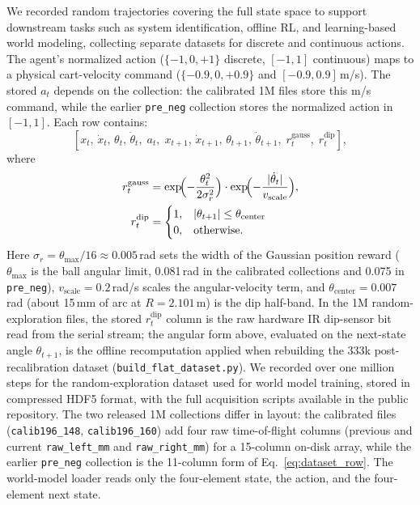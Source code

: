 We recorded random trajectories covering the full state space to
support downstream tasks such as system identification, offline RL,
and learning-based world modeling, collecting separate datasets for
discrete and continuous actions. The agent's normalized action
($\{-1, 0, +1\}$ discrete, $[-1,1]$ continuous) maps to a physical
cart-velocity command ($\{-0.9, 0, +0.9\}$ and $[-0.9, 0.9]$\,m/s). The
stored $a_t$ depends on the collection: the calibrated 1M files store this
m/s command, while the earlier \texttt{pre\_neg} collection stores the
normalized action in $[-1,1]$.
Each row contains:
\begin{equation}
\label{eq:dataset_row}
[x_t,\, \dot{x}_t,\, \theta_t,\, \dot{\theta}_t,\; a_t,\;
 x_{t+1},\, \dot{x}_{t+1},\, \theta_{t+1},\, \dot{\theta}_{t+1},\;
 r^\text{gauss}_t,\; r^\text{dip}_t],
\end{equation}
where
\begin{align}
r^\text{gauss}_t &=
  \exp\!\Bigl(-\frac{\theta_t^2}{2\sigma_r^2}\Bigr)
  \cdot
  \exp\!\Bigl(-\frac{|\dot{\theta}_t|}{v_\text{scale}}\Bigr),
\\
r^\text{dip}_t &=
\begin{cases}
1, & |\theta_{t+1}| \le \theta_\text{center} \\
0, & \text{otherwise.}
\end{cases}
\end{align}
Here $\sigma_r = \theta_\text{max}/16 \approx 0.005$\,rad sets the width
of the Gaussian position reward ($\theta_\text{max}$ is the ball angular
limit, 0.081\,rad in the calibrated collections and 0.075 in
\texttt{pre\_neg}), $v_\text{scale} = 0.2$\,rad/s scales the
angular-velocity term, and $\theta_\text{center} = 0.007$\,rad
(about 15\,mm of arc at $R = 2.101$\,m) is the dip half-band. In the 1M
random-exploration files, the stored $r^\text{dip}_t$ column is the raw
hardware IR dip-sensor bit read from the serial stream; the angular form
above, evaluated on the next-state angle $\theta_{t+1}$, is the offline
recomputation applied when rebuilding the 333k post-recalibration dataset
(\texttt{build\_flat\_dataset.py}).
We recorded over one million steps for the random-exploration
dataset used for world model training, stored in compressed HDF5
format, with the full acquisition scripts available in the public
repository. The two released 1M collections differ in layout: the
calibrated files (\texttt{calib196\_148}, \texttt{calib196\_160}) add four
raw time-of-flight columns (previous and current \texttt{raw\_left\_mm} and
\texttt{raw\_right\_mm}) for a 15-column on-disk array, while the earlier
\texttt{pre\_neg} collection is the 11-column form of
Eq.~\ref{eq:dataset_row}. The world-model loader reads only the
four-element state, the action, and the four-element next state.

